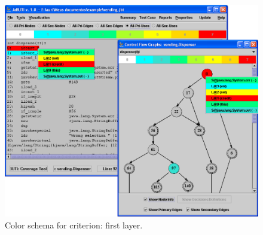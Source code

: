 \begin{figure}[!ht]
\begin{center}
\includegraphics[height=0.40\textheight]{fig/pri-uses-layer1}
\caption{\label{fig:uses-color} Color schema for 
criterion: first layer.}
\end{center}
\end{figure}
